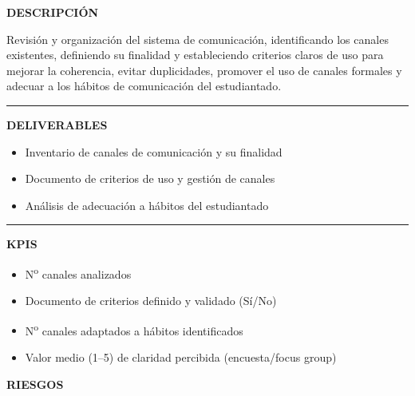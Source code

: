 \documentclass[11pt,a4paper]{scrreprt}
\newcommand{\fieldlabel}[1]{%
  {\footnotesize\sffamily\bfseries\color{mutedcolor}\MakeUppercase{#1}}\par\nopagebreak[4]
}
\newcommand{\fieldsep}{\vspace{3pt}\noindent\textcolor{bordercolor}{\rule{\linewidth}{0.4pt}}\vspace{3pt}\par}
\begin{document}
\begin{tcolorbox}[pabox={e360color}{PA1.1 \enspace\textbullet\enspace Organización de canales de comunicación con el estudiantado}]

\fieldlabel{Descripci\'on}
{\small Revisión y organización del sistema de comunicación, identificando los canales existentes, definiendo su finalidad y estableciendo criterios claros de uso para mejorar la coherencia, evitar duplicidades, promover el uso de canales formales y adecuar a los hábitos de comunicación del estudiantado.}\par
\fieldsep
\fieldlabel{Deliverables}
{\small \begin{itemize}[noitemsep,topsep=2pt]
\item Inventario de canales de comunicación y su finalidad
\item Documento de criterios de uso y gestión de canales
\item Análisis de adecuación a hábitos del estudiantado
\end{itemize}}\par
\fieldsep
\fieldlabel{KPIs}
{\small \begin{itemize}[noitemsep,topsep=2pt]
\item N\textsuperscript{o} canales analizados
\item Documento de criterios definido y validado (Sí/No)
\item N\textsuperscript{o} canales adaptados a hábitos identificados
\item Valor medio (1--5) de claridad percibida (encuesta/focus group)
\end{itemize}}\par
\end{tcolorbox}
\begin{tcolorbox}[riskbox]
{\footnotesize\sffamily\bfseries\color{red!50!black} RIESGOS}\par{}
\end{tcolorbox}
\end{document}
